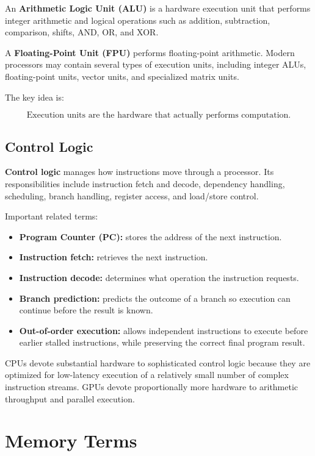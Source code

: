 \documentclass[11pt,a4paper]{article}
\begin{document}
An \textbf{Arithmetic Logic Unit (ALU)} is a hardware execution unit that performs integer arithmetic and logical operations such as addition, subtraction, comparison, shifts, AND, OR, and XOR.

A \textbf{Floating-Point Unit (FPU)} performs floating-point arithmetic. Modern processors may contain several types of execution units, including integer ALUs, floating-point units, vector units, and specialized matrix units.

The key idea is:

\[
\boxed{\text{Execution units are the hardware that actually performs computation.}}
\]

\subsection{Control Logic}

\textbf{Control logic} manages how instructions move through a processor. Its responsibilities include instruction fetch and decode, dependency handling, scheduling, branch handling, register access, and load/store control.

Important related terms:

\begin{itemize}
    \item \textbf{Program Counter (PC):} stores the address of the next instruction.
    \item \textbf{Instruction fetch:} retrieves the next instruction.
    \item \textbf{Instruction decode:} determines what operation the instruction requests.
    \item \textbf{Branch prediction:} predicts the outcome of a branch so execution can continue before the result is known.
    \item \textbf{Out-of-order execution:} allows independent instructions to execute before earlier stalled instructions, while preserving the correct final program result.
\end{itemize}

CPUs devote substantial hardware to sophisticated control logic because they are optimized for low-latency execution of a relatively small number of complex instruction streams. GPUs devote proportionally more hardware to arithmetic throughput and parallel execution.

\section{Memory Terms}
\end{document}
